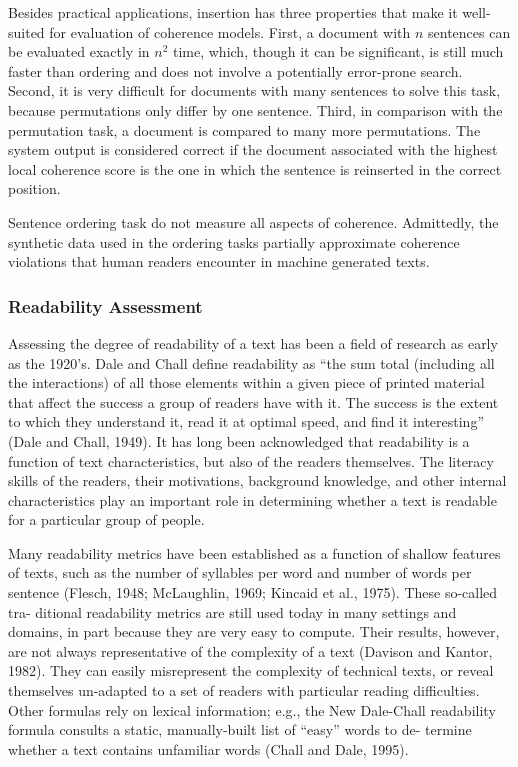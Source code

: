 Besides practical applications, insertion has three properties that make it well-suited for evaluation of coherence models. 
First, a document with $n$ sentences can be evaluated exactly in $n^2$ time, which, though it can be significant, is still much faster than ordering and does not involve a potentially error-prone search.
Second, it is very difficult for documents with many sentences to solve this task, because permutations only differ by one sentence.  
Third, in comparison with the permutation task, a document is compared to many more permutations. 
The system output is considered correct if the document associated with the highest local coherence score is the one in which the sentence is reinserted in the correct position. 

Sentence ordering task do not measure all aspects of coherence. 
Admittedly, the synthetic data used in the ordering tasks partially approximate coherence violations that human readers encounter in machine generated texts. 


\subsubsection{Readability Assessment}

Assessing the degree of readability of a text has been a field of research as early as the 1920's. Dale and Chall define readability as “the sum total (including all the interactions) of all those elements within a given piece of printed material that affect the success a group of readers have with it. The success is the extent to which they understand it, read it at optimal speed, and find it interesting” (Dale and Chall, 1949). It has long been acknowledged that readability is a function of text characteristics, but also of the readers themselves. The literacy skills of the readers, their motivations, background knowledge, and other internal characteristics play an important role in determining whether a text is readable for a particular group of people. 


Many readability metrics have been established as a function of shallow features of texts, such as the number of syllables per word and number of words per sentence (Flesch, 1948; McLaughlin, 1969; Kincaid et al., 1975). These so-called tra- ditional readability metrics are still used today in many settings and domains, in part because they are very easy to compute. Their results, however, are not always representative of the complexity of a text (Davison and Kantor, 1982). They can easily misrepresent the complexity of technical texts, or reveal themselves un-adapted to a set of readers with particular reading difficulties. Other formulas rely on lexical information; e.g., the New Dale-Chall readability formula consults a static, manually-built list of “easy” words to de- termine whether a text contains unfamiliar words (Chall and Dale, 1995).

